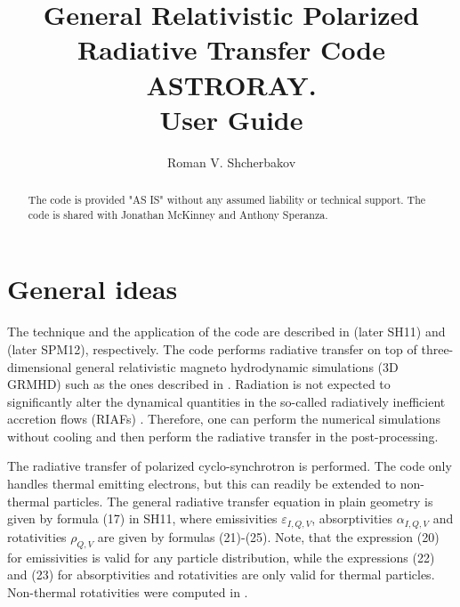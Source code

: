\documentclass{emulateapj}
\begin{document}
\title{General Relativistic Polarized Radiative Transfer Code ASTRORAY. \\User Guide}

\author{Roman V. Shcherbakov}

\setcounter{page}{1}


\begin{abstract}
The code is provided "AS IS" without any assumed liability or technical support.
The code is shared with Jonathan McKinney and Anthony Speranza.
\end{abstract}



\section{General ideas}
The technique and the application of the code are described in \citet{Shcherbakov:2011inter} (later SH11) and \citet{Shcherbakov:2012appl} (later SPM12), respectively.
The code performs radiative transfer on top of three-dimensional general relativistic magneto hydrodynamic simulations (3D GRMHD) such as the ones described in
\citet{Penna:2010dj,Tchekhovskoy:2011qp,McKinney2012,Narayan:2012dw}. Radiation is not expected to significantly alter the dynamical quantities in the
so-called radiatively inefficient accretion flows (RIAFs) \citep{Narayan:1998re,Quataert:2001op}. Therefore, one can perform the numerical simulations
without cooling and then perform the radiative transfer in the post-processing.

The radiative transfer of polarized cyclo-synchrotron is performed. The code only handles thermal emitting electrons, but this can readily be extended to non-thermal particles.
The general radiative transfer equation in plain geometry is given by formula (17) in SH11, where emissivities $\varepsilon_{I,Q,V}$, absorptivities $\alpha_{I,Q,V}$ and rotativities
$\rho_{Q,V}$ are given by formulas (21)-(25). Note, that the expression (20) for emissivities is valid for any particle distribution, while the expressions (22) and (23)
for absorptivities and rotativities are only valid for thermal particles. Non-thermal rotativities were computed in \citet{Huang:2011de}.
\end{document}
